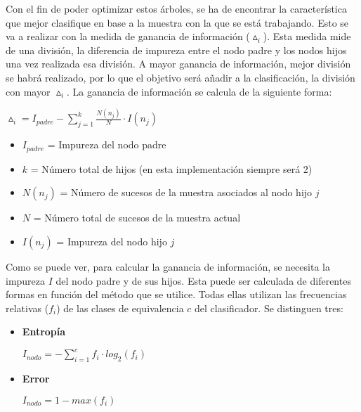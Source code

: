 \documentclass[12pt]{report}\usepackage[]{graphicx}\usepackage[dvipsnames]{xcolor}
\begin{document}
\begin{enumerate}
 				Con el fin de poder optimizar estos árboles, se ha de encontrar la característica que mejor clasifique en base a la muestra con la que se está trabajando. Esto se va a realizar con la medida de ganancia de información ($\vartriangle_i$). Esta medida mide de una división, la diferencia de impureza entre el nodo padre y los nodos hijos una vez realizada esa división. A mayor ganancia de información, mejor división se habrá realizado, por lo que el objetivo será añadir a la clasificación, la división con mayor $\vartriangle_i$. La ganancia de información se calcula de la siguiente forma:
 				
 				\begin{center}
 					$\vartriangle_i = I_{padre} - \sum_{j=1}^k \frac{N(n_j)}{N} \cdot I(n_j)$
 				\end{center}
 				
 				\begin{itemize}
 					\item $I_{padre}$ = Impureza del nodo padre
 					\item $k$ = Número total de hijos (en esta implementación siempre será 2)
 					\item $N(n_j)$ = Número de sucesos de la muestra asociados al nodo hijo $j$
 					\item $N$ = Número total de sucesos de la muestra actual
 					\item $I(n_j)$ = Impureza del nodo hijo $j$
 				\end{itemize}
 				
 				Como se puede ver, para calcular la ganancia de información, se necesita la impureza $I$ del nodo padre y de sus hijos. Esta puede ser calculada de diferentes formas en función del método que se utilice. Todas ellas utilizan las frecuencias relativas ($f_i$) de las clases de equivalencia $c$ del clasificador. Se distinguen tres:
 				
 				\begin{itemize}
 					\item \textbf{Entropía}
 					
 					\begin{center}
 						$ I_{nodo} = - \sum_{i=1}^{c} f_i \cdot log_2(f_i)$
 					\end{center}
 					
 					\item \textbf{Error}
 					
 					\begin{center}
 						$I_{nodo} = 1 - max(f_i)$
 					\end{center}
 					

\end{itemize}
\end{enumerate}
\end{document}
